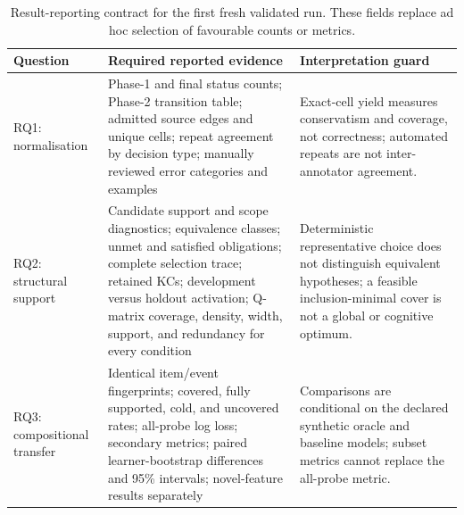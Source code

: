 \begin{table}[t]
  \centering
  \small
  \begin{tabularx}{\textwidth}{@{}l X X@{}}
    \toprule
    Question & Required reported evidence & Interpretation guard \\
    \midrule
    RQ1: normalisation
      & Phase-1 and final status counts; Phase-2 transition table; admitted
        source edges and unique cells; repeat agreement by decision type;
        manually reviewed error categories and examples
      & Exact-cell yield measures conservatism and coverage, not correctness;
        automated repeats are not inter-annotator agreement. \\
    RQ2: structural support
      & Candidate support and scope diagnostics; equivalence classes; unmet
        and satisfied obligations; complete selection trace; retained KCs;
        development versus holdout activation; Q-matrix coverage, density,
        width, support, and redundancy for every condition
      & Deterministic representative choice does not distinguish equivalent
        hypotheses; a feasible inclusion-minimal cover is not a global or
        cognitive optimum. \\
    RQ3: compositional transfer
      & Identical item/event fingerprints; covered, fully supported, cold, and
        uncovered rates; all-probe log loss; secondary metrics; paired
        learner-bootstrap differences and 95\% intervals; novel-feature
        results separately
      & Comparisons are conditional on the declared synthetic oracle and
        baseline models; subset metrics cannot replace the all-probe metric. \\
    \bottomrule
  \end{tabularx}
  \caption{Result-reporting contract for the first fresh validated run.  These
  fields replace ad hoc selection of favourable counts or metrics.}
  \label{tab:results-contract}
\end{table}
